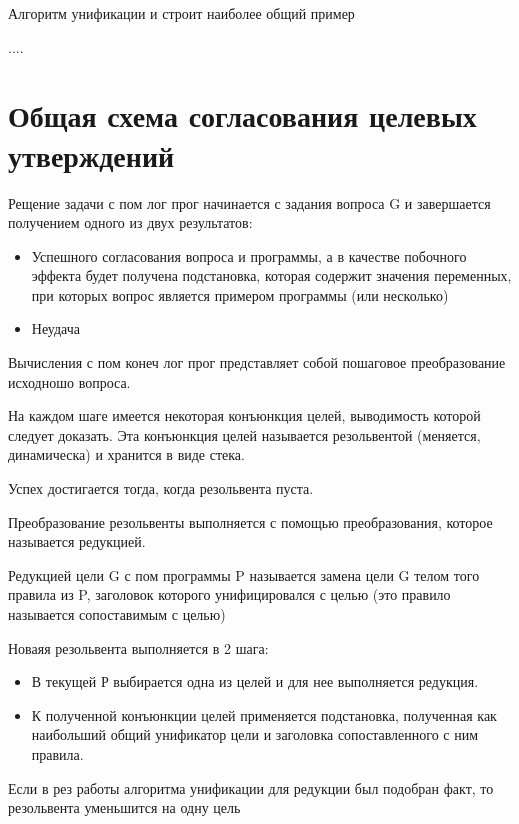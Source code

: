\documentclass[12pt]{report}
\begin{document}
Алгоритм унификации и строит наиболее общий пример

....



\section{Общая схема согласования целевых утверждений}

Рещение задачи с пом лог прог начинается с задания вопроса G и завершается получением одного из двух результатов: 
\begin{itemize}
	\item Успешного согласования вопроса и программы, а в качестве побочного эффекта будет получена подстановка, которая содержит значения переменных, при которых вопрос является примером программы (или несколько)
	\item Неудача
\end{itemize}

Вычисления с пом конеч лог прог представляет собой пошаговое преобразование исходношо вопроса.

На каждом шаге имеется некоторая конъюнкция целей, выводимость которой следует доказать. Эта конъюнкция целей называется резольвентой (меняется, динамическа) и хранится в виде стека.

Успех достигается тогда, когда резольвента пуста.


Преобразование резольвенты выполняется с помощью преобразования, которое называется редукцией.

Редукцией цели G с пом программы P называется замена цели G телом того правила из P, заголовок которого унифицировался с целью (это правило называется сопоставимым с целью)

Новаяя резольвента выполняется в 2 шага:
\begin{itemize}
	\item  В текущей Р выбирается одна из целей и для нее выполняется редукция.
	\item  К полученной конъюнкции целей применяется подстановка, полученная как наибольший общий унификатор цели и заголовка сопоставленного с ним правила.
\end{itemize}

Если в рез работы алгоритма унификации для редукции был подобран факт, то резольвента уменьшится на одну цель
\end{document}
